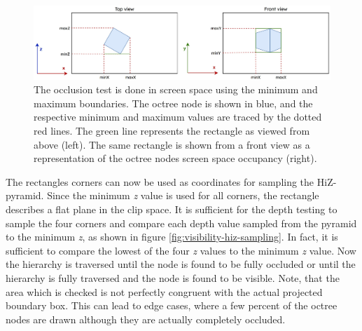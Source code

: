 \begin{figure}[h]
    \centering
    \includegraphics[width=\linewidth]{images/graphics/screen_space_occlusion_test.jpg}
    \caption{The occlusion test is done in screen space using the minimum and maximum boundaries. The octree node 
    is shown in blue, and the respective minimum and maximum values are traced by the dotted red lines. The green 
    line represents the rectangle as viewed from above (left). The same rectangle is shown from a front view as a 
    representation of the octree nodes screen space occupancy (right).}
    \label{fig:screen-space-occlusion-test}
\end{figure}

\noindent
The rectangles corners can now be used as coordinates for sampling the \ac{HiZ}-pyramid. Since the minimum \emph{z} 
value is used for all corners, the rectangle describes a flat plane in the clip space. It is sufficient for the 
depth testing to sample the four corners and compare each depth value sampled from the pyramid to the minimum \emph{z},
as shown in figure \ref{fig:visibility-hiz-sampling}.
In fact, it is sufficient to compare the lowest of the four \emph{z} values to the minimum \emph{z} value. Now the 
hierarchy is traversed until the node is found to be fully occluded or until the hierarchy is fully traversed and the 
node is found to be visible. Note, that the area which is checked is not perfectly congruent with the actual projected 
boundary box. This can lead to edge cases, where a few percent of the octree nodes are drawn although they are actually 
completely occluded.

